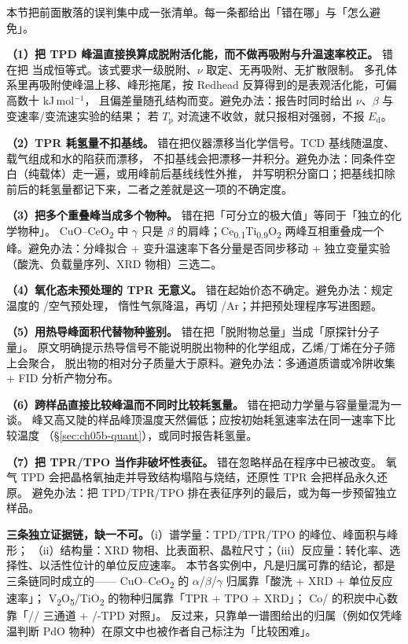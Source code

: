 \begin{pitfall}
本节把前面散落的误判集中成一张清单。每一条都给出「错在哪」与「怎么避免」。

\textbf{（1）把 TPD 峰温直接换算成脱附活化能，而不做再吸附与升温速率校正。}
错在把  当成恒等式。该式要求一级脱附、$\nu$ 取定、无再吸附、无扩散限制。
多孔体系里再吸附使峰温上移、峰形拖尾，按 Redhead 反算得到的是表观活化能，可偏高数十 kJ\,mol$^{-1}$，
且偏差量随孔结构而变。避免办法：报告时同时给出 $\nu$、$\beta$ 与变速率/变流速实验的结果；
若 $T_{\mathrm p}$ 对流速不收敛，就只报相对强弱，不报 $E_{\mathrm d}$。

\textbf{（2）TPR 耗氢量不扣基线。} 错在把仪器漂移当化学信号。TCD 基线随温度、载气组成和水的陷获而漂移，
不扣基线会把漂移一并积分。避免办法：同条件空白（纯载体）走一遍，或用峰前后基线线性外推，
并写明积分窗口；把基线扣除前后的耗氢量都记下来，二者之差就是这一项的不确定度。

\textbf{（3）把多个重叠峰当成多个物种。} 错在把「可分立的极大值」等同于「独立的化学物种」。
CuO--CeO\textsubscript{2} 中 $\gamma$ 只是 $\beta$ 的肩峰；Ce\textsubscript{0.1}Ti\textsubscript{0.9}O\textsubscript{2}
两峰互相重叠成一个峰。避免办法：分峰拟合 + 变升温速率下各分量是否同步移动 + 独立变量实验
（酸洗、负载量序列、XRD 物相）三选二。

\textbf{（4）氧化态未预处理的 TPR 无意义。} 错在起始价态不确定。避免办法：规定温度的 /空气预处理，
惰性气氛降温，再切 /Ar；并把预处理程序写进图题。

\textbf{（5）用热导峰面积代替物种鉴别。} 错在把「脱附物总量」当成「原探针分子量」。
原文明确提示热导信号不能说明脱出物种的化学组成，乙烯/丁烯在分子筛上会聚合，
脱出物的相对分子质量大于原料。避免办法：多通道质谱或冷阱收集 + FID 分析产物分布。

\textbf{（6）跨样品直接比较峰温而不同时比较耗氢量。} 错在把动力学量与容量量混为一谈。
峰又高又陡的样品峰顶温度天然偏低；应按初始耗氢速率法在同一速率下比较温度
（\S\ref{sec:ch05b-quant}），或同时报告耗氢量。

\textbf{（7）把 TPR/TPO 当作非破坏性表征。} 错在忽略样品在程序中已被改变。
氧气 TPD 会把晶格氧抽走并导致结构塌陷与烧结，还原性 TPR 会把样品永久还原。
避免办法：把 TPD/TPR/TPO 排在表征序列的最后，或为每一步预留独立样品。
\end{pitfall}

\begin{crosscheck}
\textbf{三条独立证据链，缺一不可。}（i）谱学量：TPD/TPR/TPO 的峰位、峰面积与峰形；
（ii）结构量：XRD 物相、比表面积、晶粒尺寸；（iii）反应量：转化率、选择性、以活性位计的单位反应速率。
本节各实例中，凡是归属可靠的结论，都是三条链同时成立的——
CuO--CeO\textsubscript{2} 的 $\alpha$/$\beta$/$\gamma$ 归属靠「酸洗 + XRD + 单位反应速率」；
V\textsubscript{2}O\textsubscript{5}/TiO\textsubscript{2} 的物种归属靠「TPR + TPO + XRD」；
Co/ 的积炭中心数靠「// 三通道 + /-TPD 对照」。
反过来，只靠单一谱图给出的归属（例如仅凭峰温判断 PdO 物种）在原文中也被作者自己标注为「比较困难」。
\end{crosscheck}

